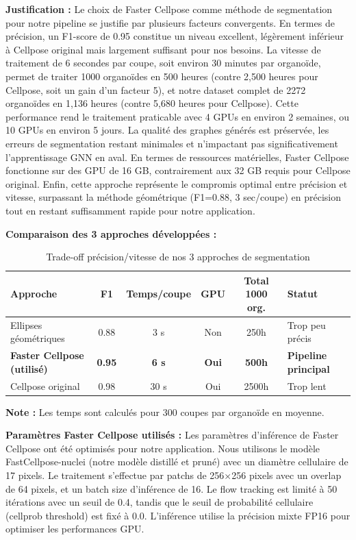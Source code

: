 \textbf{Justification :}
Le choix de Faster Cellpose comme méthode de segmentation pour notre pipeline se justifie par plusieurs facteurs convergents. En termes de précision, un F1-score de 0.95 constitue un niveau excellent, légèrement inférieur à Cellpose original mais largement suffisant pour nos besoins. La vitesse de traitement de 6 secondes par coupe, soit environ 30 minutes par organoïde, permet de traiter 1000 organoïdes en 500 heures (contre 2,500 heures pour Cellpose, soit un gain d'un facteur 5), et notre dataset complet de 2272 organoïdes en 1,136 heures (contre 5,680 heures pour Cellpose). Cette performance rend le traitement praticable avec 4 GPUs en environ 2 semaines, ou 10 GPUs en environ 5 jours. La qualité des graphes générés est préservée, les erreurs de segmentation restant minimales et n'impactant pas significativement l'apprentissage GNN en aval. En termes de ressources matérielles, Faster Cellpose fonctionne sur des GPU de 16 GB, contrairement aux 32 GB requis pour Cellpose original. Enfin, cette approche représente le compromis optimal entre précision et vitesse, surpassant la méthode géométrique (F1=0.88, 3 sec/coupe) en précision tout en restant suffisamment rapide pour notre application.

\textbf{Comparaison des 3 approches développées :}
\begin{table}[h]
\centering
\caption{Trade-off précision/vitesse de nos 3 approches de segmentation}
\begin{tabular}{lccccl}
\toprule
\textbf{Approche} & \textbf{F1} & \textbf{Temps/coupe} & \textbf{GPU} & \textbf{Total 1000 org.} & \textbf{Statut} \\
\midrule
Ellipses géométriques & 0.88 & 3 s & Non & 250h & Trop peu précis\\
\textbf{Faster Cellpose (utilisé)} & \textbf{0.95} & \textbf{6 s} & \textbf{Oui} & \textbf{500h} & \textbf{Pipeline principal} \\
Cellpose original & 0.98 & 30 s & Oui & 2500h & Trop lent \\
\bottomrule
\end{tabular}
\end{table}

\textbf{Note :} Les temps sont calculés pour 300 coupes par organoïde en moyenne.

\textbf{Paramètres Faster Cellpose utilisés :}
Les paramètres d'inférence de Faster Cellpose ont été optimisés pour notre application. Nous utilisons le modèle FastCellpose-nuclei (notre modèle distillé et pruné) avec un diamètre cellulaire de 17 pixels. Le traitement s'effectue par patchs de 256×256 pixels avec un overlap de 64 pixels, et un batch size d'inférence de 16. Le flow tracking est limité à 50 itérations avec un seuil de 0.4, tandis que le seuil de probabilité cellulaire (cellprob threshold) est fixé à 0.0. L'inférence utilise la précision mixte FP16 pour optimiser les performances GPU.

